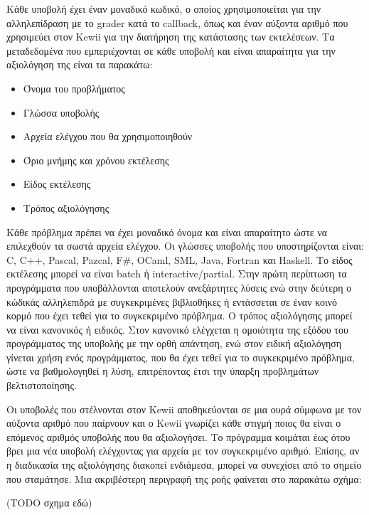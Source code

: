\documentclass[diploma]{softlab-thesis}
\begin{document}
\bigskip

Κάθε υποβολή έχει έναν μοναδικό κωδικό, ο οποίος χρησιμοποιείται για την
αλληλεπίδραση με το grader κατά το callback, όπως και έναν αύξοντα αριθμό που
χρησιμεύει στον Kewii για την διατήρηση της κατάστασης των εκτελέσεων. Τα
μεταδεδομένα που εμπεριέχονται σε κάθε υποβολή και είναι απαραίτητα για την
αξιολόγηση της είναι τα παρακάτω:

\begin{itemize}
  \item Όνομα του προβλήματος
  \item Γλώσσα υποβολής
  \item Αρχεία ελέγχου που θα χρησιμοποιηθούν
  \item Όριο μνήμης και χρόνου εκτέλεσης
  \item Είδος εκτέλεσης
  \item Τρόπος αξιολόγησης
\end{itemize}

Κάθε πρόβλημα πρέπει να έχει μοναδικό όνομα και είναι απαραίτητο ώστε να
επιλεχθούν τα σωστά αρχεία ελέγχου. Οι γλώσσες υποβολής που υποστηρίζονται
είναι: C, C++, Pascal, Pazcal, F\#, OCaml, SML, Java, Fortran και Haskell. Το
είδος εκτέλεσης μπορεί να είναι batch ή interactive/partial. Στην πρώτη
περίπτωση τα προγράμματα που υποβάλλονται αποτελούν ανεξάρτητες λύσεις ενώ στην
δεύτερη ο κώδικάς αλληλεπιδρά με συγκεκριμένες βιβλιοθήκες ή εντάσσεται σε έναν
κοινό κορμό που έχει τεθεί για το συγκεκριμένο πρόβλημα. Ο τρόπος αξιολόγησης
μπορεί να είναι κανονικός ή ειδικός. Στον κανονικό ελέγχεται η ομοιότητα της
εξόδου του προγράμματος της υποβολής με την ορθή απάντηση, ενώ στον ειδική
αξιολόγηση γίνεται χρήση ενός προγράμματος, που θα έχει τεθεί για το
συγκεκριμένο πρόβλημα, ώστε να βαθμολογηθεί η λύση, επιτρέποντας έτσι την
ύπαρξη προβλημάτων βελτιστοποίησης.

\bigskip

Οι υποβολές που στέλνονται στον Kewii αποθηκεύονται σε μια ουρά σύμφωνα με τον
αύξοντα αριθμό που παίρνουν και ο Kewii γνωρίζει κάθε στιγμή ποιος θα είναι ο
επόμενος αριθμός υποβολής που θα αξιολογήσει. Το πρόγραμμα κοιμάται έως ότου
βρει μια νέα υποβολή ελέγχοντας για αρχεία με τον συγκεκριμένο αριθμό. Επίσης,
αν η διαδικασία της αξιολόγησης διακοπεί ενδιάμεσα, μπορεί να συνεχίσει από το
σημείο που σταμάτησε. Μια ακριβέστερη περιγραφή της ροής φαίνεται στο παρακάτω
σχήμα:

(TODO σχημα εδώ)

\bigskip
\end{document}
